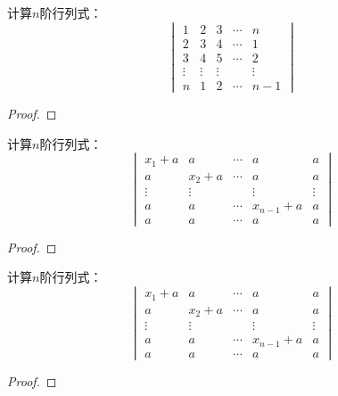 \begin{problem}
计算\(n\)阶行列式：
\begin{equation*}
    \begin{vmatrix}
        1      & 2      & 3      & \cdots & n      \\
        2      & 3      & 4      & \cdots & 1      \\
        3      & 4      & 5      & \cdots & 2      \\
        \vdots & \vdots & \vdots &        & \vdots \\
        n      & 1      & 2      & \cdots & n-1
    \end{vmatrix}
\end{equation*}
\end{problem}
\begin{proof}

\end{proof}

\begin{problem}
计算\(n\)阶行列式：
\begin{equation*}
    \begin{vmatrix}
        x_{1}+a & a       & \cdots & a         & a      \\
        a       & x_{2}+a & \cdots & a         & a      \\
        \vdots  & \vdots  &        & \vdots    & \vdots \\
        a       & a       & \cdots & x_{n-1}+a & a      \\
        a       & a       & \cdots & a         & a
    \end{vmatrix}
\end{equation*}
\end{problem}
\begin{proof}

\end{proof}

\begin{problem}
计算\(n\)阶行列式：
\begin{equation*}
    \begin{vmatrix}
        x_1+a  & a      & \cdots & a         & a      \\
        a      & x_2+a  & \cdots & a         & a      \\
        \vdots & \vdots &        & \vdots    & \vdots \\
        a      & a      & \cdots & x_{n-1}+a & a      \\
        a      & a      & \cdots & a         & a
    \end{vmatrix}
\end{equation*}
\end{problem}
\begin{proof}
\end{proof}

